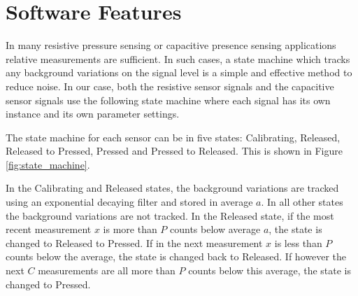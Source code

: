 \documentclass{sigchi-ext}
\begin{document}
\section{Software Features}
In many resistive pressure sensing or capacitive presence sensing
applications relative measurements are sufficient. In such cases, a state
machine which tracks any background variations on the signal level is a simple
and effective method to reduce noise. In our case, both the resistive sensor
signals and the capacitive sensor signals use the following state machine where
each signal has its own instance and its own parameter settings.

The state machine for each sensor can be in five states: Calibrating, Released,
Released to Pressed, Pressed and Pressed to Released.
This is shown in Figure \ref{fig:state_machine}.

In the Calibrating and Released states, the background variations are tracked
using an exponential decaying filter and stored in average $a$. In all other
states the background variations are not tracked. In the Released state, if the
most recent measurement $x$ is more than $P$ counts below average $a$, the state
is changed to Released to Pressed. If in the next measurement $x$ is less
than $P$ counts below the average, the state is changed back to Released. If
however the next $C$ measurements are all more than $P$ counts below this
average, the state is changed to Pressed.
\end{document}
